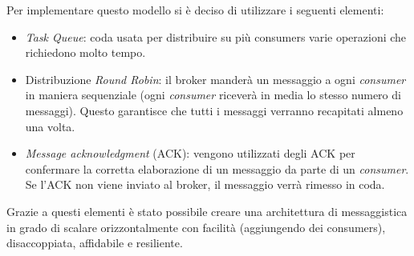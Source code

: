 Per implementare questo modello si è deciso di utilizzare i seguenti elementi:
\begin{itemize}
    \item \textit{Task Queue}: coda usata per distribuire su più consumers varie operazioni che richiedono molto tempo.
    \item Distribuzione \textit{Round Robin}: il broker manderà un messaggio a ogni \textit{consumer} in maniera sequenziale (ogni \textit{consumer} riceverà in media lo stesso numero di messaggi). Questo garantisce che tutti i messaggi verranno recapitati almeno una volta.
    \item \textit{Message acknowledgment} (ACK): vengono utilizzati degli ACK per confermare la corretta elaborazione di un messaggio da parte di un \textit{consumer}. Se l'ACK non viene inviato al broker, il messaggio verrà rimesso in coda.
\end{itemize}
Grazie a questi elementi è stato possibile creare una architettura di messaggistica in grado di scalare orizzontalmente con facilità (aggiungendo dei consumers), disaccoppiata, affidabile e resiliente.



